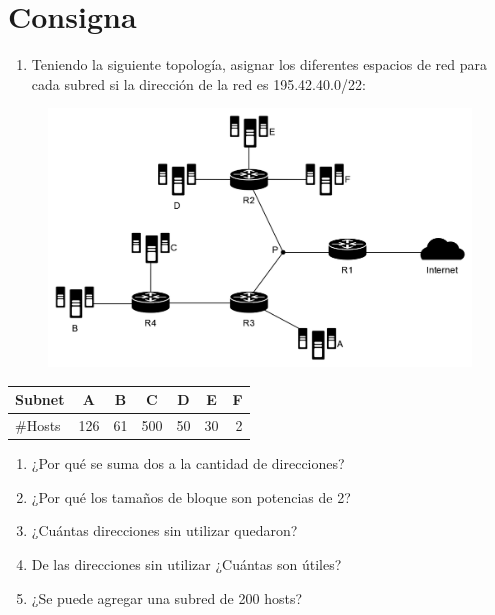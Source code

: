 \section*{Consigna}

\begin{enumerate}
    \item Teniendo la siguiente topología, asignar los diferentes espacios de red para cada subred si la dirección de la red es 195.42.40.0/22:
\end{enumerate}

\vspace{-\baselineskip}
\begin{figure}[H]
    \centering
    \includegraphics[width=1\linewidth]{Images/topologia.png}
\end{figure}

\vspace{-\baselineskip}
\begin{table}[H]
    \centering
    \begin{tabular}{|l|c|c|c|c|c|c|}
    \hline
    \multicolumn{1}{|c|}{Subnet} & A & B & C & D & E & F \\ \hline
    \#Hosts & \multicolumn{1}{r|}{126} & \multicolumn{1}{r|}{61} & \multicolumn{1}{r|}{500} & \multicolumn{1}{r|}{50} & \multicolumn{1}{r|}{30} & \multicolumn{1}{r|}{2} \\ \hline
    \end{tabular}
\end{table}

\begin{enumerate}[start=2]
    \item ¿Por qué se suma dos a la cantidad de direcciones?
    \item ¿Por qué los tamaños de bloque son potencias de 2?
    \item ¿Cuántas direcciones sin utilizar quedaron?
    \item De las direcciones sin utilizar ¿Cuántas son útiles?
    \item ¿Se puede agregar una subred de 200 hosts?
\end{enumerate}